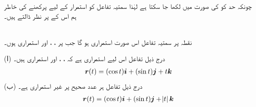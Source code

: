 چونکہ حد کو    کی صورت میں لکھا جا سکتا ہے لہٰذا  سمتیہ  تفاعل کو استمرار کے لیے پرکھنے کی خاطر ہم اس  کے  پر نظر ڈالتے ہیں۔

\\
نقطہ  پر سمتیہ  تفاعل   اس صورت استمراری ہو گا جب   پر ، ،  اور  استمراری ہوں۔

(ا) درج ذیل تفاعل اس لیے استمراری  ہے کہ ،  ، اور  استمراری ہیں۔
\begin{align*}
{\ensuremath{{\boldsymbol{r}}}}(t)=(\cos t){\boldsymbol{i}}+(\sin t){\boldsymbol{j}}+t {\boldsymbol{k}}
\end{align*}
(ب) درج ذیل  تفاعل ہر عدد صحیح پر  غیر  استمراری ہے۔
\begin{align*}
{\ensuremath{{\boldsymbol{r}}}}(t)=(\cos t){\boldsymbol{i}}+(\sin t){\boldsymbol{j}}+\abs{t} {\boldsymbol{k}}
\end{align*}

